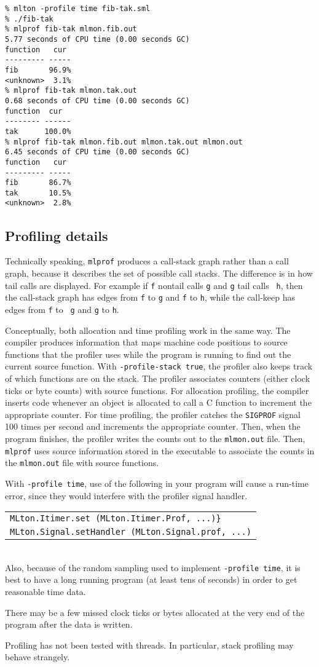 \begin{verbatim}
% mlton -profile time fib-tak.sml
% ./fib-tak
% mlprof fib-tak mlmon.fib.out
5.77 seconds of CPU time (0.00 seconds GC)
function   cur 
--------- -----
fib       96.9%
<unknown>  3.1%
% mlprof fib-tak mlmon.tak.out
0.68 seconds of CPU time (0.00 seconds GC)
function  cur  
-------- ------
tak      100.0%
% mlprof fib-tak mlmon.fib.out mlmon.tak.out mlmon.out
6.45 seconds of CPU time (0.00 seconds GC)
function   cur 
--------- -----
fib       86.7%
tak       10.5%
<unknown>  2.8%
\end{verbatim}

\subsection{Profiling details}

Technically speaking, {\tt mlprof} produces a call-stack graph rather
than a call graph, because it describes the set of possible call
stacks.  The difference is in how tail calls are displayed.  For
example if {\tt f} nontail calls {\tt g} and {\tt g} tail calls {\tt
h}, then the call-stack graph has edges from {\tt f} to {\tt g} and
{\tt f} to {\tt h}, while the call-keep has edges from {\tt f} to {\tt
g} and {\tt g} to {\tt h}.

Conceptually, both allocation and time profiling work in the same way.
The compiler produces information that maps machine code positions to
source functions that the profiler uses while the program is running
to find out the current source function.  With {\tt -profile-stack
true}, the profiler also keeps track of which functions are on the
stack.  The profiler associates counters (either clock ticks or byte
counts) with source functions.  For allocation profiling, the compiler
inserts code whenever an object is allocated to call a C function to
increment the appropriate counter.  For time profiling, the profiler
catches the {\tt SIGPROF} signal 100 times per second and increments
the appropriate counter.  Then, when the program finishes, the
profiler writes the counts out to the {\tt mlmon.out} file.  Then,
{\tt mlprof} uses source information stored in the executable to
associate the counts in the {\tt mlmon.out} file with source
functions.

With {\tt -profile time}, use of the following in your program will
cause a run-time error, since they would interfere with the profiler
signal handler.\\
\begin{tabular}{l}
\tt MLton.Itimer.set (MLton.Itimer.Prof, ...)\}\\
\tt MLton.Signal.setHandler (MLton.Signal.prof, ...)
\end{tabular}\\
Also, because of the random sampling used to implement {\tt -profile
time}, it is best to have a long running program (at least tens of
seconds) in order to get reasonable time data.

There may be a few missed clock ticks or bytes allocated at the
very end of the program after the data is written.

Profiling has not been tested with threads.  In particular, stack
profiling may behave strangely.
